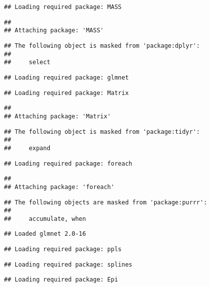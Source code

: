 \documentclass[]{article}
\begin{document}
\begin{verbatim}
## Loading required package: MASS
\end{verbatim}

\begin{verbatim}
## 
## Attaching package: 'MASS'
\end{verbatim}

\begin{verbatim}
## The following object is masked from 'package:dplyr':
## 
##     select
\end{verbatim}

\begin{verbatim}
## Loading required package: glmnet
\end{verbatim}

\begin{verbatim}
## Loading required package: Matrix
\end{verbatim}

\begin{verbatim}
## 
## Attaching package: 'Matrix'
\end{verbatim}

\begin{verbatim}
## The following object is masked from 'package:tidyr':
## 
##     expand
\end{verbatim}

\begin{verbatim}
## Loading required package: foreach
\end{verbatim}

\begin{verbatim}
## 
## Attaching package: 'foreach'
\end{verbatim}

\begin{verbatim}
## The following objects are masked from 'package:purrr':
## 
##     accumulate, when
\end{verbatim}

\begin{verbatim}
## Loaded glmnet 2.0-16
\end{verbatim}

\begin{verbatim}
## Loading required package: ppls
\end{verbatim}

\begin{verbatim}
## Loading required package: splines
\end{verbatim}

\begin{verbatim}
## Loading required package: Epi
\end{verbatim}
\end{document}
